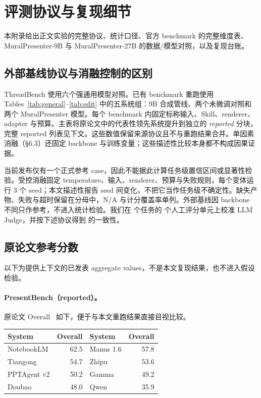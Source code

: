 \section{评测协议与复现细节}
\label{app:protocol}
\setcounter{figure}{0}
\renewcommand{\thefigure}{A\arabic{figure}}
\renewcommand{\theHfigure}{A\arabic{figure}}

本附录给出正文实验的完整协议、统计口径、官方 benchmark 的完整维度表、MuralPresenter-9B 与 MuralPresenter-27B 的数据/模型对照，以及复现台账。

\subsection{外部基线协议与消融控制的区别}

ThreadBench 使用六个强通用模型对照。已有 benchmark 重跑使用 Tables~\ref{tab:general}--\ref{tab:edit} 中的五系统组：9B 合成管线、两个未微调对照和两个 MuralPresenter 模型。每个 benchmark 内固定标称输入、Skill、renderer、adapter 与预算。主表将原论文中的代表性领先系统提升到独立的 \emph{reported} 分块，完整 reported 列表见下文。这些数值保留来源协议且不与重跑结果合并。单因素消融（\S6.3）还固定 backbone 与训练变量；这些描述性比较本身都不构成因果证据。

当前发布仅有一个正式参考 case，因此不能据此计算任务级置信区间或显著性检验。受控消融固定 temperature、输入、renderer、预算与失败规则，每个变体运行 3 个 seed；本文描述性报告 seed 间变化，不把它当作任务级不确定性。缺失产物、失败与超时保留在分母中，N/A 与计分覆盖率单列。外部基线因 backbone 不同只作参考，不进入统计检验。我们在  个任务的  个人工评分单元上校准 LLM Judge，并按下述协议得到  的一致性。

\subsection{原论文参考分数}

以下为提供上下文的已发表 aggregate values，不是本文复现结果，也不进入假设检验。

\paragraph{PresentBench（reported）。} 原论文 Overall~\citep{chen2026presentbench} 如下，便于与本文重跑结果直接目视比较。
\begin{center}\small
\begin{tabular}{lrlr}
\toprule System & Overall & System & Overall \\
\midrule
NotebookLM & 62.5 & Manus 1.6 & 57.8 \\
Tiangong & 54.7 & Zhipu & 53.6 \\
PPTAgent v2 & 50.2 & Gamma & 49.2 \\
Doubao & 48.0 & Qwen & 35.9 \\
\bottomrule
\end{tabular}
\end{center}

